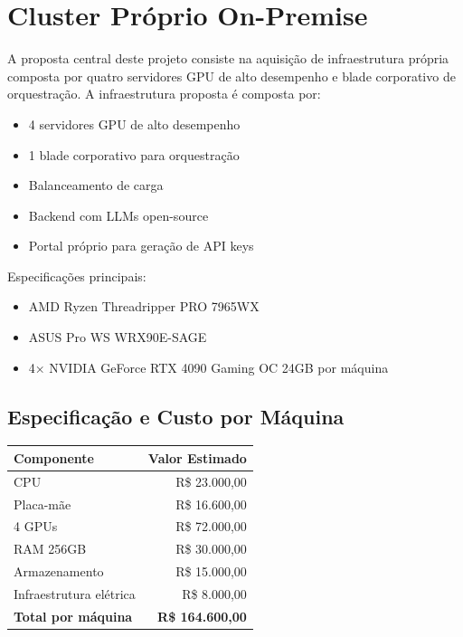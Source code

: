 \documentclass[12pt,a4paper,]{abntex2}
\begin{document}
\newpage
\section{Cluster Próprio On-Premise}
A proposta central deste projeto consiste na aquisição de infraestrutura própria composta por quatro servidores GPU de alto desempenho e blade corporativo de orquestração.
A infraestrutura proposta é composta por:

\begin{itemize}
\item 4 servidores GPU de alto desempenho
\item 1 blade corporativo para orquestração
\item Balanceamento de carga
\item Backend com LLMs open-source
\item Portal próprio para geração de API keys
\end{itemize}

Especificações principais:

\begin{itemize}
\item AMD Ryzen Threadripper PRO 7965WX
\item ASUS Pro WS WRX90E-SAGE
\item 4× NVIDIA GeForce RTX 4090 Gaming OC 24GB por máquina
\end{itemize}

\subsection{Especificação e Custo por Máquina}

\begin{table}[h]
\centering
\begin{tabular}{|l|r|}
\hline
\textbf{Componente} & \textbf{Valor Estimado} \\
\hline
CPU & R\$ 23.000,00 \\
Placa-mãe & R\$ 16.600,00 \\
4 GPUs & R\$ 72.000,00 \\
RAM 256GB & R\$ 30.000,00 \\
Armazenamento & R\$ 15.000,00 \\
Infraestrutura elétrica & R\$ 8.000,00 \\
\hline
\textbf{Total por máquina} & \textbf{R\$ 164.600,00} \\
\hline
\end{tabular}
\end{table}
\end{document}

